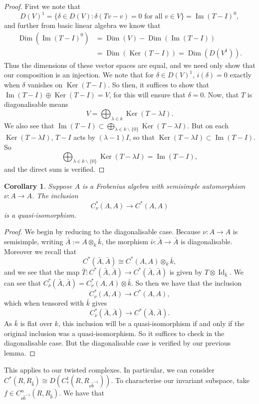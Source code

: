 \documentclass{article}
\theoremstyle{plain}
\newtheorem{corollary}[theorem]{Corollary}
\theoremstyle{definition}
\begin{document}
\begin{proof} First we note that
$$D(V)^1 = \{ \delta \in D(V): \delta(Tv-v) =0 \textrm{ for all } v \in V \} = \operatorname{Im}(T-I)^0,$$
and further from basic linear algebra we know that 
$$\begin{aligned}\operatorname{Dim}(\operatorname{Im}(T-I)^0) &= \operatorname{Dim}(V) - \operatorname{Dim}(\operatorname{Im}(T-I)) \\
&=\operatorname{Dim}(\operatorname{Ker}(T-I)) = \operatorname{Dim}(D(V^1)).\end{aligned}$$
Thus the dimensions of these vector spaces are equal, and we need only show that our composition is an injection. We note that for $\delta \in D(V)^1$, $i(\delta)=0$ exactly when $\delta$ vanishes on $\operatorname{Ker}(T-I)$. So then, it suffices to show that $\operatorname{Im}(T-I)\oplus \operatorname{Ker}(T-I)=V$, for this will ensure that $\delta=0$. Now, that $T$ is diagonalisable means
$$V = \bigoplus_{\lambda \in k} \operatorname{Ker}(T-\lambda I).$$
We also see that $\operatorname{Im}(T-I) \subset \bigoplus_{\lambda \in k \backslash \{0\}} \operatorname{Ker}(T-\lambda I)$. But on each $\operatorname{Ker}(T-\lambda I)$, $T-I$ acts by $(\lambda-1)I$, so that $\operatorname{Ker}(T-\lambda I) \subset \operatorname{Im}(T- I)$. So
$$ \bigoplus_{\lambda \in k \backslash \{0\}} \operatorname{Ker}(T-\lambda I) = \operatorname{Im}(T-I),$$
and the direct sum is verified. 
\end{proof}
\begin{corollary} Suppose $A$ is a Frobenius algebra with semisimple automorphism $\nu:A\rightarrow A$. The inclusion
$$C^*_\nu(A,A) \rightarrow C^*(A,A)$$
is a quasi-isomorphism. \end{corollary}
\begin{proof} 
We begin by reducing to the diagonalisable case. Because $\nu: A \rightarrow A$ is semisimple, writing $\bar{A} := A \otimes_k \bar{k}$, the morphism $\bar{\nu}: \bar{A} \rightarrow \bar{A}$ is diagonalisable. Moreover we recall that
$$C^*(\bar{A}, \bar{A}) \cong C^*(A,A) \otimes_k \bar{k},$$
and we see that the map $\bar{T}:C^*(\bar{A}, \bar{A}) \rightarrow C^*(\bar{A}, \bar{A})$ is given by $T \otimes \operatorname{Id}_{\bar{k}}$. We can see that $C^*_{\bar{\nu}}(\bar{A}, \bar{A}) = C^*_\nu(A,A) \otimes \bar{k}$. So then we have that the inclusion
$$C^*_\nu(A,A) \rightarrow C^*(A,A),$$
which when tensored with $\bar{k}$ gives
$$C^*_{\bar{\nu}}(\bar{A}, \bar{A}) \rightarrow C^*(\bar{A}, \bar{A}).$$
As $\bar{k}$ is flat over $k$, this inclusion will be a quasi-isomorphism if and only if the original inclusion was a quasi-isomorphism. So it suffices to check in the diagonalisable case. But the diagonalisable case is verified by our previous lemma.
\end{proof}
This applies to our twisted complexes. In particular, we can consider $C^*(R,R_{\hat{b}}) \cong D(C_*^1(R,R_{\nu \hat{b}^{-1}}))$. To characterise our invariant subspace, take $f \in C_{\nu\hat{b}^{-1}}^n(R,R_{\hat{b}})$. We have that
\end{document}
